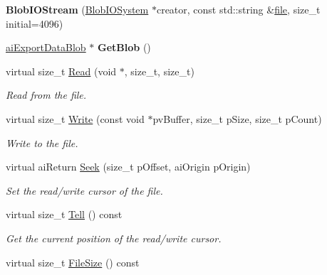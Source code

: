 \begin{DoxyCompactItemize}
\item 
\hypertarget{class_assimp_1_1_blob_i_o_stream_a8f35d99f46306fe8e7b7fb02d8b09f38}{{\bfseries Blob\+I\+O\+Stream} (\hyperlink{class_assimp_1_1_blob_i_o_system}{Blob\+I\+O\+System} $\ast$creator, const std\+::string \&\hyperlink{structfile}{file}, size\+\_\+t initial=4096)}\label{class_assimp_1_1_blob_i_o_stream_a8f35d99f46306fe8e7b7fb02d8b09f38}

\item 
\hypertarget{class_assimp_1_1_blob_i_o_stream_a2a56b4a3d41096ee4da98b859ba067fd}{\hyperlink{structai_export_data_blob}{ai\+Export\+Data\+Blob} $\ast$ {\bfseries Get\+Blob} ()}\label{class_assimp_1_1_blob_i_o_stream_a2a56b4a3d41096ee4da98b859ba067fd}

\item 
virtual size\+\_\+t \hyperlink{class_assimp_1_1_blob_i_o_stream_a9752238a2b888f5aaa9f3cc9c94c80d6}{Read} (void $\ast$, size\+\_\+t, size\+\_\+t)
\begin{DoxyCompactList}\small\item\em Read from the file. \end{DoxyCompactList}\item 
virtual size\+\_\+t \hyperlink{class_assimp_1_1_blob_i_o_stream_aed9dda065eee635d2f8c9eeb8133461a}{Write} (const void $\ast$pv\+Buffer, size\+\_\+t p\+Size, size\+\_\+t p\+Count)
\begin{DoxyCompactList}\small\item\em Write to the file. \end{DoxyCompactList}\item 
virtual ai\+Return \hyperlink{class_assimp_1_1_blob_i_o_stream_a0339ebce4ceff0d69da349643c00d861}{Seek} (size\+\_\+t p\+Offset, ai\+Origin p\+Origin)
\begin{DoxyCompactList}\small\item\em Set the read/write cursor of the file. \end{DoxyCompactList}\item 
virtual size\+\_\+t \hyperlink{class_assimp_1_1_blob_i_o_stream_a7b68bda417d5367ed6d42f6299ba3dac}{Tell} () const 
\begin{DoxyCompactList}\small\item\em Get the current position of the read/write cursor. \end{DoxyCompactList}\item 
\hypertarget{class_assimp_1_1_blob_i_o_stream_afdb3ebb1a859463b595666dd97a69124}{virtual size\+\_\+t \hyperlink{class_assimp_1_1_blob_i_o_stream_afdb3ebb1a859463b595666dd97a69124}{File\+Size} () const }\label{class_assimp_1_1_blob_i_o_stream_afdb3ebb1a859463b595666dd97a69124}


\end{DoxyCompactItemize}
